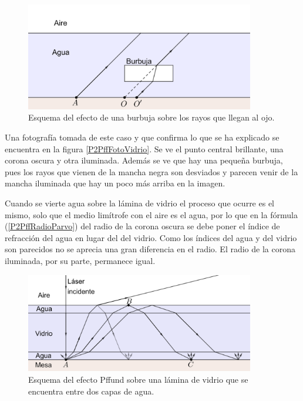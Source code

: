 \documentclass[12pt]{article}
\numberwithin{table}{section}
\numberwithin{figure}{section}
\numberwithin{equation}{section}
\begin{document}
\begin{figure}[!ht]
	\small \centering \sffamily
	\begin{center}
		\includegraphics[width=10cm]{P2PffBurbuja.png}
		\caption{Esquema del efecto de una burbuja sobre los rayos que llegan al ojo.}
		\label{P2PffBurbuja}
	\end{center}
\end{figure}

Una fotografía tomada de este caso y que confirma lo que se ha explicado se encuentra en la figura \ref{P2PffFotoVidrio}. Se ve el punto central brillante, una corona oscura y otra iluminada. Además se ve que hay una pequeña burbuja, pues los rayos que vienen de la mancha negra son desviados y parecen venir de la mancha iluminada que hay un poco más arriba en la imagen.

Cuando se vierte agua sobre la lámina de vidrio el proceso que ocurre es el mismo, solo que el medio limítrofe con el aire es el agua, por lo que en la fórmula (\ref{P2PffRadioParvo}) del radio de la corona oscura se debe poner el índice de refracción del agua en lugar del del vidrio. Como los índices del agua y del vidrio son parecidos no se aprecia una gran diferencia en el radio. El radio de la corona iluminada, por su parte, permanece igual.

\begin{figure}[!ht]
	\small \centering \sffamily
	\begin{center}
		\includegraphics[width=10cm]{P2PffAgria.png}
		\caption{Esquema del efecto Pffund sobre una lámina de vidrio que se encuentra entre dos capas de agua.}
		\label{P2PffAgria}
	\end{center}
\end{figure}
\end{document}
